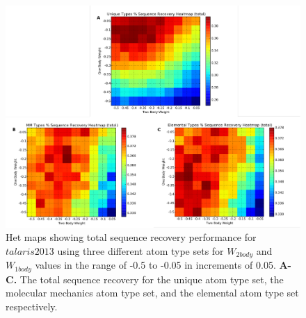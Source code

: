 \begin{figure}[hbtp]
  \includegraphics[width=\linewidth]{Figures/small_gridsearch_atom_type_sets.pdf}
  \caption{Het maps showing total sequence recovery performance for $talaris2013$ using three different atom type sets for $W_{2body}$ and $W_{1body}$ values in the range of -0.5 to -0.05 in increments of 0.05.
  \textbf{A-C.} The total sequence recovery for the unique atom type set, the molecular mechanics atom type set, and the elemental atom type set respectively.}
  \label{fig:gridsearch_atypes}
\end{figure}


